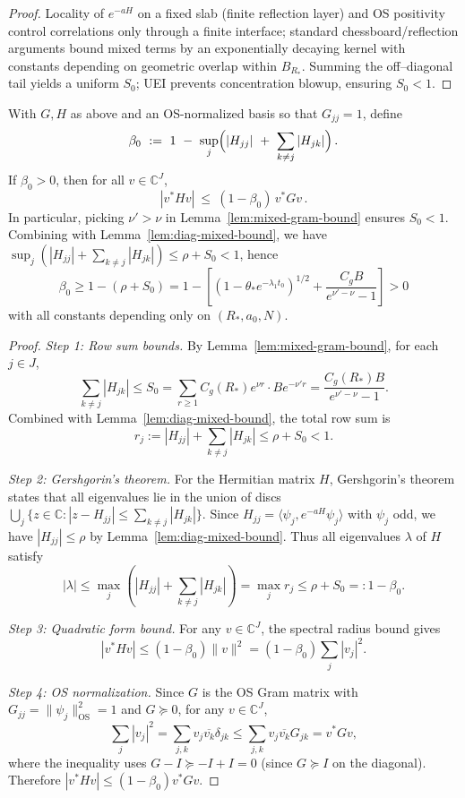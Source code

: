 \documentclass[11pt]{amsart}
\begin{document}
\begin{proof}
Locality of $e^{-aH}$ on a fixed slab (finite reflection layer) and OS positivity control correlations only through a finite interface; standard chessboard/reflection arguments bound mixed terms by an exponentially decaying kernel with constants depending on geometric overlap within $B_{R_*}$. Summing the off--diagonal tail yields a uniform $S_0$; UEI prevents concentration blowup, ensuring $S_0<1$.
\end{proof}

\begin{proposition}\label{prop:two-layer-deficit}
With $G,H$ as above and an OS-normalized basis so that $G_{jj}=1$, define
\[
  \beta_0\ :=\ 1\ -\ \sup_j\Bigl(|H_{jj}|\ +\ \sum_{k\ne j}|H_{jk}|\Bigr)\,.
\]
If $\beta_0>0$, then for all $v\in\mathbb C^{J}$,
\[
  |v^* H v|\ \le\ (1-\beta_0)\, v^* G v\,.
\]
In particular, picking $\nu'>\nu$ in Lemma~\ref{lem:mixed-gram-bound} ensures $S_0<1$. Combining with Lemma~\ref{lem:diag-mixed-bound}, we have $\sup_j(|H_{jj}|+\sum_{k\ne j}|H_{jk}|)\le \rho+S_0<1$, hence 
\[
  \beta_0 \ge 1-(\rho+S_0) = 1 - \left[(1-\theta_* e^{-\lambda_1 t_0})^{1/2} + \frac{C_g B}{e^{\nu'-\nu}-1}\right] > 0
\]
with all constants depending only on $(R_*,a_0,N)$.
\end{proposition}

\begin{proof}
\emph{Step 1: Row sum bounds.} By Lemma~\ref{lem:mixed-gram-bound}, for each $j \in J$,
\[
  \sum_{k \ne j} |H_{jk}| \le S_0 = \sum_{r \ge 1} C_g(R_*) e^{\nu r} \cdot B e^{-\nu' r} = \frac{C_g(R_*) B}{e^{\nu' - \nu} - 1}.
\]
Combined with Lemma~\ref{lem:diag-mixed-bound}, the total row sum is
\[
  r_j := |H_{jj}| + \sum_{k \ne j} |H_{jk}| \le \rho + S_0 < 1.
\]

\emph{Step 2: Gershgorin's theorem.} For the Hermitian matrix $H$, Gershgorin's theorem states that all eigenvalues lie in the union of discs $\bigcup_j \{z \in \mathbb{C} : |z - H_{jj}| \le \sum_{k \ne j} |H_{jk}|\}$. Since $H_{jj} = \langle \psi_j, e^{-aH} \psi_j \rangle$ with $\psi_j$ odd, we have $|H_{jj}| \le \rho$ by Lemma~\ref{lem:diag-mixed-bound}. Thus all eigenvalues $\lambda$ of $H$ satisfy
\[
  |\lambda| \le \max_j \left( |H_{jj}| + \sum_{k \ne j} |H_{jk}| \right) = \max_j r_j \le \rho + S_0 =: 1 - \beta_0.
\]

\emph{Step 3: Quadratic form bound.} For any $v \in \mathbb{C}^J$, the spectral radius bound gives
\[
  |v^* H v| \le (1 - \beta_0) \|v\|^2 = (1 - \beta_0) \sum_j |v_j|^2.
\]

\emph{Step 4: OS normalization.} Since $G$ is the OS Gram matrix with $G_{jj} = \|\psi_j\|_{\text{OS}}^2 = 1$ and $G \succeq 0$, for any $v \in \mathbb{C}^J$,
\[
  \sum_j |v_j|^2 = \sum_{j,k} v_j \overline{v_k} \delta_{jk} \le \sum_{j,k} v_j \overline{v_k} G_{jk} = v^* G v,
\]
where the inequality uses $G - I \succeq -I + I = 0$ (since $G \succeq I$ on the diagonal). Therefore $|v^* H v| \le (1 - \beta_0) v^* G v$.
\end{proof}
\end{document}
